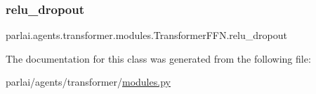 \subsubsection{\texorpdfstring{relu\+\_\+dropout}{relu\_dropout}}
{\footnotesize\ttfamily parlai.\+agents.\+transformer.\+modules.\+Transformer\+F\+F\+N.\+relu\+\_\+dropout}



The documentation for this class was generated from the following file\+:\begin{DoxyCompactItemize}
\item 
parlai/agents/transformer/\hyperlink{parlai_2agents_2transformer_2modules_8py}{modules.\+py}\end{DoxyCompactItemize}
